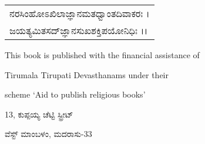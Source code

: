 \thispagestyle{empty}
{
\begin{center}

\bigskip
\begin{tabular}{l}
ನರಸಿಂಹೋಽಖಿಲಾಜ್ಞಾನಮತಧ್ವಾಂತದಿವಾಕರಃ ।\\
ಜಯತ್ಯಮಿತಸದ್‌ಜ್ಞಾನಸುಖಶಕ್ತಿಪಯೋನಿಧಿಃ ।।
\end{tabular}
\end{center}
 


\bigskip


\vfill





\vfill

\begin{center}
This book is published with the financial assistance of 

Tirumala Tirupati Devasthanams under their

scheme `Aid to publish religious books'
\end{center}

\vfill


\medskip


\smallskip

\centerline{13, ಕುಪ್ಪಯ್ಯ ಚೆಟ್ಟಿ ಸ್ಟ್ರೀಟ್}

\centerline{ವೆಸ್ಟ್ ಮಾಂಬಳಂ, ಮದರಾಸು-33}
}
